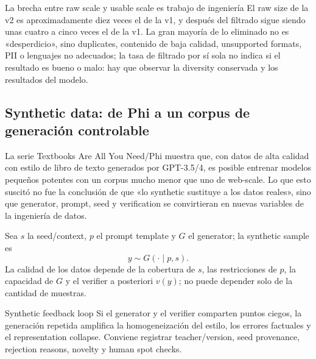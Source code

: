 \begin{importantbox}{La brecha entre raw scale y usable scale es trabajo de ingeniería}
El raw size de la v2 es aproximadamente diez veces el de la v1, y después del filtrado sigue siendo unas cuatro a cinco veces el de la v1. La gran mayoría de lo eliminado no es «desperdicio», sino duplicates, contenido de baja calidad, unsupported formats, PII o lenguajes no adecuados; la tasa de filtrado por sí sola no indica si el resultado es bueno o malo: hay que observar la diversity conservada y los resultados del modelo.
\end{importantbox}


\subsection{Synthetic data: de Phi a un corpus de generación controlable}

La serie Textbooks Are All You Need/Phi muestra que, con datos de alta calidad con estilo de libro de texto generados por GPT-3.5/4, es posible entrenar modelos pequeños potentes con un corpus mucho menor que uno de web-scale. Lo que esto suscitó no fue la conclusión de que «lo synthetic sustituye a los datos reales», sino que generator, prompt, seed y verification se convirtieran en nuevas variables de la ingeniería de datos.


Sea $s$ la seed/context, $p$ el prompt template y $G$ el generator; la synthetic sample es
\[
y\sim G(\cdot\mid p,s).
\]
La calidad de los datos depende de la cobertura de $s$, las restricciones de $p$, la capacidad de $G$ y el verifier a posteriori $v(y)$; no puede depender solo de la cantidad de muestras.

\begin{warningbox}{Synthetic feedback loop}
Si el generator y el verifier comparten puntos ciegos, la generación repetida amplifica la homogeneización del estilo, los errores factuales y el representation collapse. Conviene registrar teacher/version, seed provenance, rejection reasons, novelty y human spot checks.
\end{warningbox}


